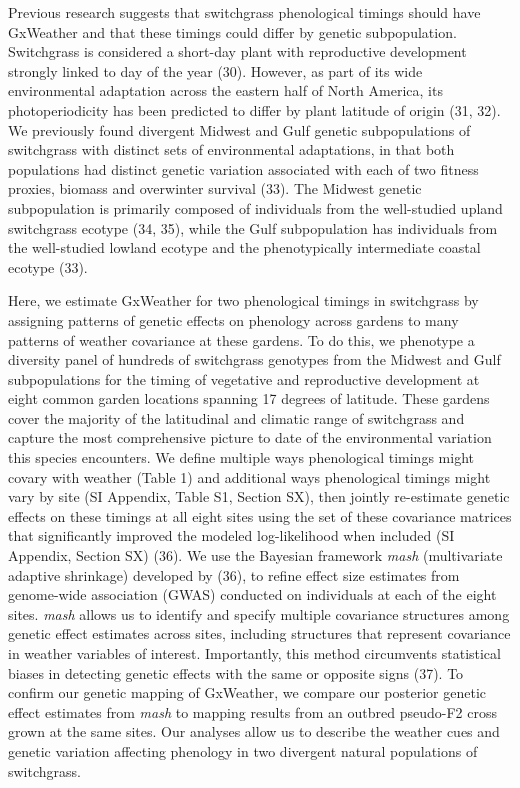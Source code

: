 \documentclass[
  9pt,
  twocolumn,
  twoside]{pnas-new}
\begin{document}
Previous research suggests that switchgrass phenological timings should
have GxWeather and that these timings could differ by genetic
subpopulation. Switchgrass is considered a short-day plant with
reproductive development strongly linked to day of the year (30).
However, as part of its wide environmental adaptation across the eastern
half of North America, its photoperiodicity has been predicted to differ
by plant latitude of origin (31, 32). We previously found divergent
Midwest and Gulf genetic subpopulations of switchgrass with distinct
sets of environmental adaptations, in that both populations had distinct
genetic variation associated with each of two fitness proxies, biomass
and overwinter survival (33). The Midwest genetic subpopulation is
primarily composed of individuals from the well-studied upland
switchgrass ecotype (34, 35), while the Gulf subpopulation has
individuals from the well-studied lowland ecotype and the phenotypically
intermediate coastal ecotype (33).

Here, we estimate GxWeather for two phenological timings in switchgrass
by assigning patterns of genetic effects on phenology across gardens to
many patterns of weather covariance at these gardens. To do this, we
phenotype a diversity panel of hundreds of switchgrass genotypes from
the Midwest and Gulf subpopulations for the timing of vegetative and
reproductive development at eight common garden locations spanning 17
degrees of latitude. These gardens cover the majority of the latitudinal
and climatic range of switchgrass and capture the most comprehensive
picture to date of the environmental variation this species encounters.
We define multiple ways phenological timings might covary with weather
(Table 1) and additional ways phenological timings might vary by site
(SI Appendix, Table S1, Section SX), then jointly re-estimate genetic
effects on these timings at all eight sites using the set of these
covariance matrices that significantly improved the modeled
log-likelihood when included (SI Appendix, Section SX) (36). We use the
Bayesian framework \emph{mash} (multivariate adaptive shrinkage)
developed by (36), to refine effect size estimates from genome-wide
association (GWAS) conducted on individuals at each of the eight sites.
\emph{mash} allows us to identify and specify multiple covariance
structures among genetic effect estimates across sites, including
structures that represent covariance in weather variables of interest.
Importantly, this method circumvents statistical biases in detecting
genetic effects with the same or opposite signs (37). To confirm our
genetic mapping of GxWeather, we compare our posterior genetic effect
estimates from \emph{mash} to mapping results from an outbred pseudo-F2
cross grown at the same sites. Our analyses allow us to describe the
weather cues and genetic variation affecting phenology in two divergent
natural populations of switchgrass.
\end{document}
